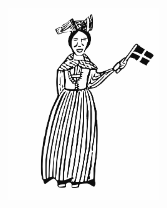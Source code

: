 \sclearpage

\begin{intersong}
	\begin{center}
		\includegraphics[width=4cm]{../bilder/fardigabilder/Danmarksnationalsng.png} 
	\end{center}
\end{intersong}


\sclearpage


\sclearpage
